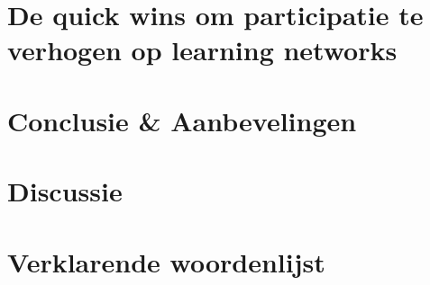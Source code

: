 \documentclass[a4paper, 10pt, pdftex]{report}
\begin{document}
  \newpage
  \chapter{De quick wins om participatie te verhogen op learning networks}
    \newpage

  \newpage
  \chapter*{Conclusie \& Aanbevelingen}

  \newpage
  \chapter*{Discussie}

  \newpage
  \chapter*{Verklarende woordenlijst}

  \newpage
  
  
\end{document}
